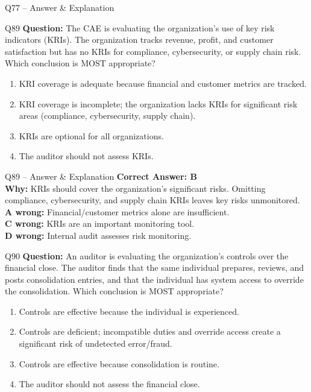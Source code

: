 \documentclass[aspectratio=169,10pt]{beamer}
\begin{document}
\begin{frame}[t]{Q77 -- Answer \& Explanation}
	\begin{frame}[t]{Q89}
		\small
		\textbf{Question:} The CAE is evaluating the organization's use of key risk indicators (KRIs). The organization tracks revenue, profit, and customer satisfaction but has no KRIs for compliance, cybersecurity, or supply chain risk. Which conclusion is MOST appropriate?
		\begin{enumerate}[label=\Alph*.,itemsep=1pt,topsep=2pt]
			\item KRI coverage is adequate because financial and customer metrics are tracked.
			\item KRI coverage is incomplete; the organization lacks KRIs for significant risk areas (compliance, cybersecurity, supply chain).
			\item KRIs are optional for all organizations.
			\item The auditor should not assess KRIs.
		\end{enumerate}
	\end{frame}
	
	\begin{frame}[t]{Q89 -- Answer \& Explanation}
		\small
		\textbf{Correct Answer: B} \\[4pt]
		\textbf{Why:} KRIs should cover the organization's significant risks. Omitting compliance, cybersecurity, and supply chain KRIs leaves key risks unmonitored. \\[4pt]
		\textbf{A wrong:} Financial/customer metrics alone are insufficient. \\[2pt]
		\textbf{C wrong:} KRIs are an important monitoring tool. \\[2pt]
		\textbf{D wrong:} Internal audit assesses risk monitoring.
	\end{frame}
	
	\begin{frame}[t]{Q90}
		\small
		\textbf{Question:} An auditor is evaluating the organization's controls over the financial close. The auditor finds that the same individual prepares, reviews, and posts consolidation entries, and that the individual has system access to override the consolidation. Which conclusion is MOST appropriate?
		\begin{enumerate}[label=\Alph*.,itemsep=1pt,topsep=2pt]
			\item Controls are effective because the individual is experienced.
			\item Controls are deficient; incompatible duties and override access create a significant risk of undetected error/fraud.
			\item Controls are effective because consolidation is routine.
			\item The auditor should not assess the financial close.
		\end{enumerate}
	\end{frame}
	

\end{frame}
\end{document}
